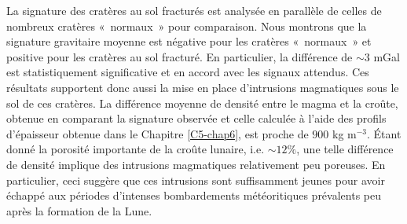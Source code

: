 La signature des  cratères au sol fracturés est  analysée en parallèle
de  celles de  nombreux  cratères « normaux »  pour comparaison.  Nous
montrons que  la signature  gravitaire moyenne  est négative  pour les
cratères « normaux » et positive pour les cratères au sol fracturé. En
particulier,  la  différence  de  $\sim 3$  mGal  est  statistiquement
significative et  en accord avec  les signaux attendus.  Ces résultats
supportent donc aussi  la mise en place  d’intrusions magmatiques sous
le sol  de ces  cratères. La  différence moyenne  de densité  entre le
magma  et la  croûte, obtenue  en comparant  la signature  observée et
celle  calculée  à l’aide  des  profils  d’épaisseur obtenue  dans  le
Chapitre \ref{C5-chap6}, est proche de  $900$ kg m$^{-3}$. Étant donné
la porosité  importante de  la croûte lunaire,  i.e. $\sim  12\%$, une
telle  différence  de  densité  implique  des  intrusions  magmatiques
relativement  peu  poreuses.  En  particulier, ceci  suggère  que  ces
intrusions sont  suffisamment jeunes  pour avoir échappé  aux périodes
d’intenses  bombardements   météoritiques  prévalents  peu   après  la
formation de la Lune.


